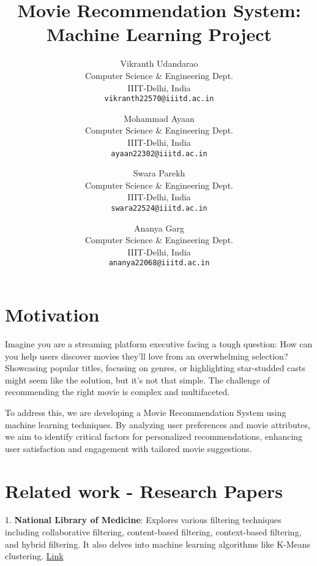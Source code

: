 \documentclass[10pt,twocolumn,letterpaper]{article}
\begin{document}
\title{Movie Recommendation System: Machine Learning Project}

\author{
Vikranth Udandarao\\
Computer Science \& Engineering Dept. \\
IIIT-Delhi, India \\
{\tt\small vikranth22570@iiitd.ac.in}
\and
Mohammad Ayaan \\
Computer Science \& Engineering Dept. \\
IIIT-Delhi, India \\
{\tt\small ayaan22302@iiitd.ac.in}
\and
Swara Parekh \\
Computer Science \& Engineering Dept. \\
IIIT-Delhi, India \\
{\tt\small swara22524@iiitd.ac.in}
\and
Ananya Garg \\
Computer Science \& Engineering Dept. \\
IIIT-Delhi, India \\
{\tt\small ananya22068@iiitd.ac.in}
}

\maketitle


\section{Motivation}
Imagine you are a streaming platform executive facing a tough question: How can you help users discover movies they'll love from an overwhelming selection? Showcasing popular titles, focusing on genres, or highlighting star-studded casts might seem like the solution, but it's not that simple. The challenge of recommending the right movie is complex and multifaceted.

To address this, we are developing a Movie Recommendation System using machine learning techniques. By analyzing user preferences and movie attributes, we aim to identify critical factors for personalized recommendations, enhancing user satisfaction and engagement with tailored movie suggestions.

\section{Related work - Research Papers}
1. \textbf{National Library of Medicine}: Explores various filtering techniques including collaborative filtering, content-based filtering, context-based filtering, and hybrid filtering. It also delves into machine learning algorithms like K-Means clustering.
\textcolor{blue}{\href{https://www.ncbi.nlm.nih.gov/pmc/articles/PMC9269752/}{Link}}
\end{document}
